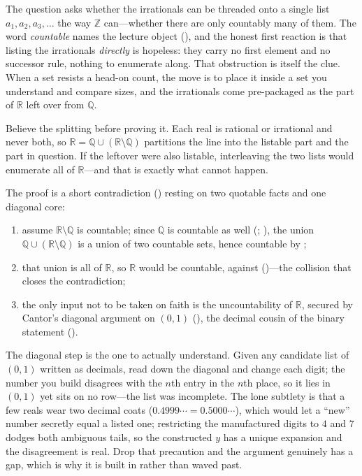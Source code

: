 \documentclass[main.tex]{subfiles}
\begin{document}
\begin{Reflection}
The question asks whether the irrationals can be threaded onto a single list $a_1,a_2,a_3,\dots$ the
way $\mathbb Z$ can---whether there are only countably many of them. The word \emph{countable} names
the lecture object (), and the honest first reaction is that listing the irrationals
\emph{directly} is hopeless: they carry no first element and no successor rule, nothing to enumerate
along. That obstruction is itself the clue. When a set resists a head-on count, the move is to place
it inside a set you understand and compare sizes, and the irrationals come pre-packaged as the part of
$\mathbb R$ left over from $\mathbb Q$.

Believe the splitting before proving it. Each real is rational or irrational and never both, so
$\mathbb R=\mathbb Q\cup(\mathbb R\setminus\mathbb Q)$ partitions the line into the listable part and
the part in question. If the leftover were also listable, interleaving the two lists would enumerate
all of $\mathbb R$---and that is exactly what cannot happen.

The proof is a short contradiction () resting on two quotable facts and one diagonal
core:
\begin{enumerate}[leftmargin=1.7em,itemsep=3pt,topsep=2pt,label=\textnormal{(\arabic*)}]
  \item assume $\mathbb R\setminus\mathbb Q$ is countable; since $\mathbb Q$ is countable as well
        (; ), the union
        $\mathbb Q\cup(\mathbb R\setminus\mathbb Q)$ is a union of two countable sets, hence countable
        by ;
  \item that union is all of $\mathbb R$, so $\mathbb R$ would be countable, against
         ()---the collision that
        closes the contradiction;
  \item the only input not to be taken on faith is the uncountability of $\mathbb R$, secured by
        Cantor's diagonal argument on $(0,1)$ (), the decimal cousin of the binary
        statement 
        ().
\end{enumerate}

The diagonal step is the one to actually understand. Given any candidate list of $(0,1)$ written as
decimals, read down the diagonal and change each digit; the number you build disagrees with the $n$th
entry in the $n$th place, so it lies in $(0,1)$ yet sits on no row---the list was incomplete. The lone
subtlety is that a few reals wear two decimal coats ($0.4999\cdots=0.5000\cdots$), which would let a
``new'' number secretly equal a listed one; restricting the manufactured digits to $4$ and $7$ dodges
both ambiguous tails, so the constructed $y$ has a unique expansion and the disagreement is real. Drop
that precaution and the argument genuinely has a gap, which is why it is built in rather than waved
past.


\end{Reflection}
\end{document}
